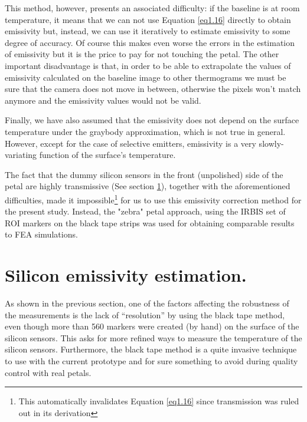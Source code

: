 		This method, however, presents an associated difficulty: if the baseline is at room temperature, it means that we can not use Equation \ref{eq1.16} directly to obtain emissivity but, instead, we can use it iteratively to estimate emissivity to some degree of accuracy. Of course this makes even worse the errors in the estimation of emissivity but it is the price to pay for not touching the petal. The other important disadvantage is that, in order to be able to extrapolate the values of emissivity calculated on the baseline image to other thermograms we must be sure that the camera does not move in between, otherwise the pixels won’t match anymore and the emissivity values would not be valid.
		
		Finally, we have also assumed that the emissivity does not depend on the surface temperature under the graybody approximation, which is not true in general. However, except for the case of selective emitters, emissivity is a very slowly-variating function of the surface’s temperature.
		
		The fact that the dummy silicon sensors in the front (unpolished) side of the petal are highly transmissive (See section \ref{section4.2}), together with the aforementioned difficulties, made it impossible\footnote{{\footnotesize This automatically invalidates Equation \ref{eq1.16} since transmission was ruled out in its derivation}} for us to use this emissivity correction method for the present study. Instead, the "zebra" petal approach, using the IRBIS set of ROI markers on the black tape strips was used for obtaining comparable results to FEA simulations.\bigskip
		
	\section{Silicon emissivity estimation.}\label{section4.2}	
		
		As shown in the previous section, one of the factors affecting the robustness of the measurements is the lack of “resolution” by using the black tape method, even though more than 560 markers were created (by hand) on the surface of the silicon sensors. This asks for more refined ways to measure the temperature of the silicon sensors. Furthermore, the black tape method is a quite invasive technique to use with the current prototype and for sure something to avoid during quality control with real petals.
		
